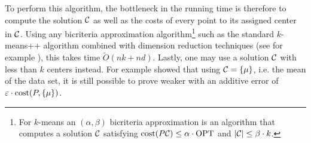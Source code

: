  To perform this algorithm, the bottleneck in the running time is therefore to compute the solution $\mathcal C$ as well as the costs of every point to its assigned center in $\mathcal C$. Using any bicriteria approximation algorithm\footnote{For $k$-means an $(\alpha,\beta)$ bicriteria approximation is an algorithm that computes a solution $\mathcal C$ satisfying $\operatorname{cost}(P\mathcal C)\leq \alpha\cdot \text{OPT}$ and $|\mathcal C|\leq \beta\cdot k$.} such as the standard $k$-means++ algorithm \cite{ArV07} combined with dimension reduction techniques (see for example \cite{BecchettiBC0S19,CohenEMMP15,MakarychevMR19}), this takes time $\tilde O(nk +nd)$. Lastly, one may use a solution $\mathcal C$ with less than $k$ centers instead. For example \cite{BachemL018} showed that using $\mathcal C=\{\mu\}$, i.e. the mean of the data set, it is still possible to prove weaker with an additive error of $\varepsilon\cdot \operatorname{cost}(P,\{\mu\})$.



%

